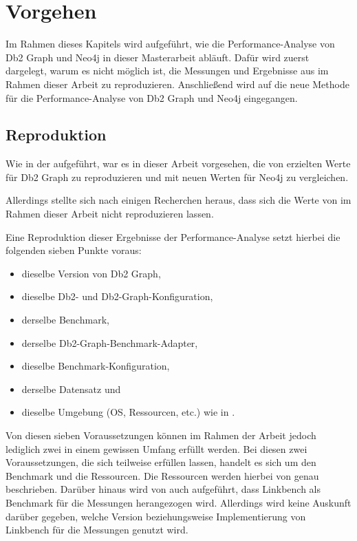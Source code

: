 \chapter{Vorgehen}
\label{vorgehen}
Im Rahmen dieses Kapitels wird aufgeführt, wie die Performance-Analyse von Db2 Graph und Neo4j in dieser Masterarbeit abläuft. Dafür wird zuerst dargelegt, warum es nicht möglich ist, die Messungen und Ergebnisse aus \cite{sigmod_tian} im Rahmen dieser Arbeit zu reproduzieren. Anschließend wird auf die neue Methode für die Performance-Analyse von Db2 Graph und Neo4j eingegangen. 

\section{Reproduktion}
\label{analyse:reproduktion}
Wie in der  aufgeführt, war es in dieser Arbeit vorgesehen, die von  erzielten Werte für Db2 Graph zu reproduzieren und mit neuen Werten für Neo4j zu vergleichen. 

Allerdings stellte sich nach einigen Recherchen heraus, dass sich die Werte von  im Rahmen dieser Arbeit nicht reproduzieren lassen. 

Eine Reproduktion dieser Ergebnisse der Performance-Analyse setzt hierbei die folgenden sieben Punkte voraus:
\begin{itemize}
    \item dieselbe Version von Db2 Graph,
    \item dieselbe Db2- und Db2-Graph-Konfiguration,
    \item derselbe Benchmark,
    \item derselbe Db2-Graph-Benchmark-Adapter,
    \item dieselbe Benchmark-Konfiguration,
    \item derselbe Datensatz und 
    \item dieselbe Umgebung (OS, Ressourcen, etc.) wie in \cite{sigmod_tian}.
\end{itemize}
Von diesen sieben Voraussetzungen können im Rahmen der Arbeit jedoch lediglich zwei in einem gewissen Umfang erfüllt werden. Bei diesen zwei Voraussetzungen, die sich teilweise erfüllen lassen, handelt es sich um den Benchmark und die Ressourcen. Die Ressourcen werden hierbei von  genau beschrieben. Darüber hinaus wird von  auch aufgeführt, dass Linkbench als Benchmark für die Messungen herangezogen wird. Allerdings wird keine Auskunft darüber gegeben, welche Version beziehungsweise Implementierung von Linkbench für die Messungen genutzt wird.

